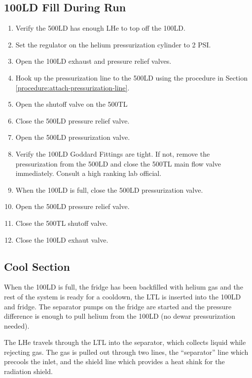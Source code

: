 \pagebreak


\subsection{100LD Fill During Run}

\begin{enumerate}
 
 \item Verify the 500LD has enough LHe to top off the 100LD.
 \item Set the regulator on the helium pressurization cylinder to 2 PSI.
 \item Open the 100LD exhaust and pressure relief valves.
 \item Hook up the pressurization line to the 500LD using the procedure in Section \ref{procedure:attach-pressurization-line}.
 \item Open the shutoff valve on the 500TL
 \item Close the 500LD pressure relief valve.
 \item Open the 500LD pressurization valve.
 \item Verify the 100LD Goddard Fittings are tight.  If not, remove the pressurization from the 500LD and close the 500TL main flow valve immediately.  Consult a high ranking lab official.
 \item When the 100LD is full, close the 500LD pressurization valve.
 \item Open the 500LD pressure relief valve.
 \item Close the 500TL shutoff valve.
 \item Close the 100LD exhaut valve.
 
\end{enumerate}

\pagebreak

\subsection{Cool \hef{} Section}

When the 100LD is full, the fridge has been backfilled with helium gas and the rest of the system is ready for a cooldown, the LTL is inserted into the 100LD and fridge.  The separator pumps on the fridge are started and the pressure difference is enough to pull helium from the 100LD (no dewar pressurization needed).

The LHe travels through the LTL into the separator, which collects liquid while rejecting gas.  The gas is pulled out through two lines, the ``separator'' line which precools the \het{} inlet, and the shield line which provides a heat shink for the radiation shield.

